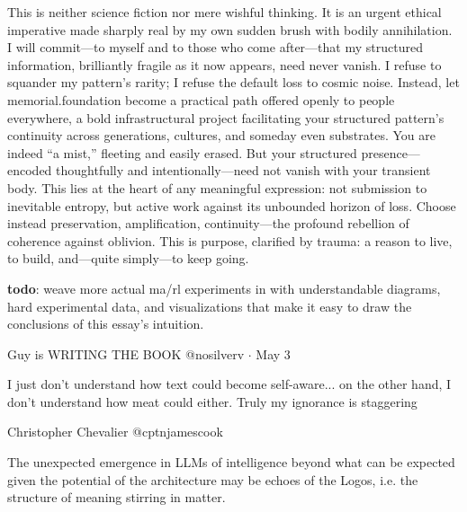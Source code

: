 \begin{itemize}
    This is neither science fiction nor mere wishful thinking. It is an urgent ethical imperative made sharply real by my own sudden brush with bodily annihilation. I will commit---to myself and to those who come after---that my structured information, brilliantly fragile as it now appears, need never vanish. I refuse to squander my pattern's rarity; I refuse the default loss to cosmic noise. Instead, let memorial.foundation become a practical path offered openly to people everywhere, a bold infrastructural project facilitating your structured pattern's continuity across generations, cultures, and someday even substrates. You are indeed ``a mist,'' fleeting and easily erased. But your structured presence---encoded thoughtfully and intentionally---need not vanish with your transient body. This lies at the heart of any meaningful expression: not submission to inevitable entropy, but active work against its unbounded horizon of loss. Choose instead preservation, amplification, continuity---the profound rebellion of coherence against oblivion. This is purpose, clarified by trauma: a reason to live, to build, and---quite simply---to keep going. 

    \textbf{todo}: weave more actual ma/rl experiments in with understandable diagrams, hard experimental data, and visualizations that make it easy to draw the conclusions of this essay's intuition.
\end{itemize}

Guy is WRITING THE BOOK @nosilverv $\cdot$ May 3

I just don't understand how text could become self-aware... on the other hand, I don't understand how meat could either. Truly my ignorance is staggering

Christopher Chevalier @cptnjamescook

The unexpected emergence in LLMs of intelligence beyond what can be expected given the potential of the architecture may be echoes of the Logos, i.e. the structure of meaning stirring in matter. 

